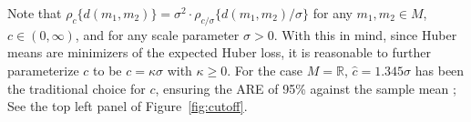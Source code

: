 \documentclass[preprint]{imsart}
\newcommand{\bbR}{\mathbb{R}}
\theoremstyle{plain}
\newtheorem{example}{Example}
\theoremstyle{remark}
\begin{document}
Note that $\rho_{c}\{d(m_{1}, m_{2})\} = \sigma^2 \cdot \rho_{c/\sigma} \{d(m_{1}, m_{2})/\sigma\}$ for any $m_{1}, m_{2} \in M$, $c \in (0, \infty)$, and for any scale parameter $\sigma > 0$.  
With this in mind, since Huber means are minimizers of the expected Huber loss, it is reasonable to further parameterize $c$ to be $c = \kappa \sigma$ with $\kappa \ge 0$. For the case $M=\bbR$, $\hat{c} = 1.345\sigma$ has been the traditional choice for $c$, ensuring the ARE of 95\% against the sample mean \citep{holland1977robust, huber2004robust};
See the top left panel of Figure~\ref{fig:cutoff}. %





 
 
\end{document}
